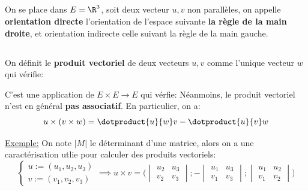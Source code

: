 \subsection*{}
On se place dans \(E = \R^3\), soit deux vecteur \(u, v\) non parallèles, on appelle \textbf{orientation directe} l'orientation de l'espace suivante \textbf{la règle de la main droite}, et orientation indirecte celle suivant la règle de la main gauche.
\pagebreak

\subsection*{}
On définit le \textbf{produit vectoriel} de deux vecteurs \(u, v\) comme l'unique vecteur \(w\) qui vérifie:

C'est une application de \(E \times E \longrightarrow E\) qui vérfie:
Néanmoins, le produit vectoriel n'est en général \textbf{pas associatif}. En particulier, on a:
\[
    u \times (v \times w) = \dotproduct{u}{w}v - \dotproduct{u}{v}w
\]

\underline{Exemple:} On note \(\big|M\big|\) le déterminant d'une matrice, alors on a une caractérisation utlie pour calculer des produits vectoriels:
\[
   \begin{cases}
      u := (u_1, u_2, u_3)\\ 
      v := (v_1, v_2, v_3)
   \end{cases} \implies 
   u \times v = \Biggl(\begin{vmatrix}u_2 & u_3 \\ v_2 & v_3\end{vmatrix} ; -\begin{vmatrix}u_1 & u_3 \\ v_1 & v_3\end{vmatrix} ; \begin{vmatrix}u_1 & u_2 \\ v_1 & v_2\end{vmatrix}\Biggl)
\]

